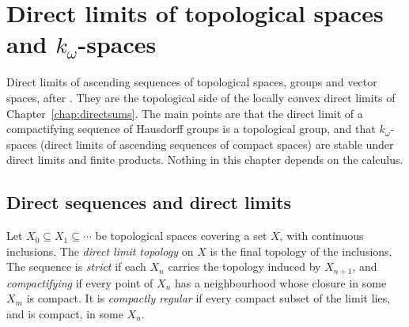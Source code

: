 \chapter{Direct limits of topological spaces and \texorpdfstring{$k_\omega$}{k-omega}-spaces}
\label{chap:topology}

Direct limits of ascending sequences of topological spaces, groups and vector spaces, after
\cite[Appendix~A.7]{GN26}. They are the topological side of the locally convex direct limits of
Chapter~\ref{chap:directsums}. The main points are that the direct limit of a compactifying sequence of
Hausdorff groups is a topological group, and that $k_\omega$-spaces (direct limits of ascending
sequences of compact spaces) are stable under direct limits and finite products. Nothing in
this chapter depends on the calculus.

\section{Direct sequences and direct limits}

\begin{definition}
  \label{def:top-dl}
  \leanok
  Let $X_0 \subseteq X_1 \subseteq \cdots$ be topological spaces covering a set $X$, with continuous
  inclusions. The \emph{direct limit topology} on $X$ is the final topology of the inclusions. The
  sequence is \emph{strict} if each $X_n$ carries the topology induced by $X_{n+1}$, and
  \emph{compactifying} if every point of $X_n$ has a neighbourhood whose closure in some $X_m$ is
  compact. It is \emph{compactly regular} if every compact subset of the limit lies, and is
  compact, in some $X_n$.
\end{definition}

